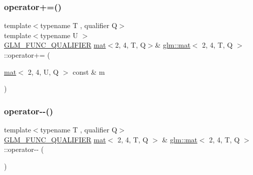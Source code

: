 \subsubsection{\texorpdfstring{operator+=()}{operator+=()}\hspace{0.1cm}{\footnotesize\ttfamily [4/4]}}
{\footnotesize\ttfamily template$<$typename T , qualifier Q$>$ \\
template$<$typename U $>$ \\
\hyperlink{setup_8hpp_a33fdea6f91c5f834105f7415e2a64407}{G\+L\+M\+\_\+\+F\+U\+N\+C\+\_\+\+Q\+U\+A\+L\+I\+F\+I\+ER} \hyperlink{structglm_1_1mat}{mat}$<$2, 4, T, Q$>$\& \hyperlink{structglm_1_1mat}{glm\+::mat}$<$ 2, 4, T, Q $>$\+::operator+= (\begin{DoxyParamCaption}\item[{\hyperlink{structglm_1_1mat}{mat}$<$ 2, 4, U, Q $>$ const \&}]{m }\end{DoxyParamCaption})}

\mbox{\label{structglm_1_1mat_3_012_00_014_00_01_t_00_01_q_01_4_ad5fe0c9f99081a7811a94e12c4353e5b}} 
\subsubsection{\texorpdfstring{operator-\/-\/()}{operator--()}\hspace{0.1cm}{\footnotesize\ttfamily [1/2]}}
{\footnotesize\ttfamily template$<$typename T , qualifier Q$>$ \\
\hyperlink{setup_8hpp_a33fdea6f91c5f834105f7415e2a64407}{G\+L\+M\+\_\+\+F\+U\+N\+C\+\_\+\+Q\+U\+A\+L\+I\+F\+I\+ER} \hyperlink{structglm_1_1mat}{mat}$<$ 2, 4, T, Q $>$ \& \hyperlink{structglm_1_1mat}{glm\+::mat}$<$ 2, 4, T, Q $>$\+::operator-\/-\/ (\begin{DoxyParamCaption}{ }\end{DoxyParamCaption})}

\mbox{\label{structglm_1_1mat_3_012_00_014_00_01_t_00_01_q_01_4_a740949114d5da039edaed9052968f54b}} 
